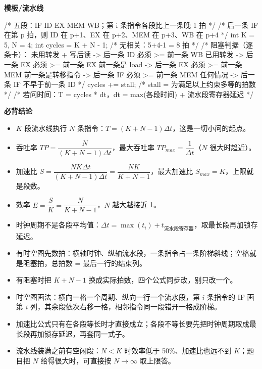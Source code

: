 \documentclass[10pt,a4paper]{ctexart}
\begin{document}
\textbf{模板/流水线}

\begin{codebox}
/* 五段：IF ID EX MEM WB；第 i 条指令各段比上一条晚 1 拍 */
/* 后一条 IF 在第 p 拍，则 ID 在 p+1、EX 在 p+2、MEM 在 p+3、WB 在 p+4 */
int K = 5, N = 4;
int cycles = K + N - 1;          /* 无相关：5+4-1 = 8 拍 */
/* 阻塞判据（逐条卡）：
   未用转发 + 写后读 -> 后一条 ID 必须 >= 前一条 WB
   已用转发         -> 后一条 EX 必须 >= 前一条 EX
   前一条是 load    -> 后一条 EX 必须 >= 前一条 MEM
   前一条是转移指令  -> 后一条 IF 必须 >= 前一条 MEM
   任何情况        -> 后一条 IF 不早于前一条 ID          */
cycles += stall;                 /* stall = 为满足以上约束多等的拍数 */
/* 若问时间：T = cycles * dt，dt = max(各段时间) + 流水段寄存器延迟 */
\end{codebox}




\textbf{必背结论}

\begin{itemize}

\item $K$ 段流水线执行 $N$ 条指令：$T=(K+N-1)\Delta t$，这是一切小问的起点。

\item 吞吐率 $TP=\dfrac{N}{(K+N-1)\Delta t}$，最大吞吐率 $TP_{max}=\dfrac{1}{\Delta t}$（$N$ 很大时趋近）。

\item 加速比 $S=\dfrac{NK\Delta t}{(K+N-1)\Delta t}=\dfrac{NK}{K+N-1}$，最大加速比 $S_{max}=K$，上限就是段数。

\item 效率 $E=\dfrac{S}{K}=\dfrac{N}{K+N-1}$，$N$ 越大越接近 1。

\item 时钟周期不是各段平均值：$\Delta t=\max(t_i)+t_{\text{流水段寄存器}}$，取最长段再加锁存延迟。

\item 有时空图先数拍：横轴时钟、纵轴流水段，一条指令占一条阶梯斜线；空格就是阻塞拍，总拍数 = 最后一行的结束列。

\item 有阻塞时把 $K+N-1$ 换成实际拍数，四个公式同步改，别只改一个。

\item 时空图画法：横向一格一个周期、纵向一行一个流水段，第 $i$ 条指令的 IF 画第 $i$ 列，其余段依次右移一格，相邻指令同一段错开一格成阶梯。

\item 加速比公式只有在各段等长时才直接成立；各段不等长要先把时钟周期取成最长段再加锁存延迟，再套同一式子。

\item 流水线装满之前有空闲段：$N<K$ 时效率低于 50\%、加速比也远不到 $K$；题目把 $N$ 给得很大时，可直接按 $N\to\infty$ 取上限答。

\end{itemize}
\end{document}
